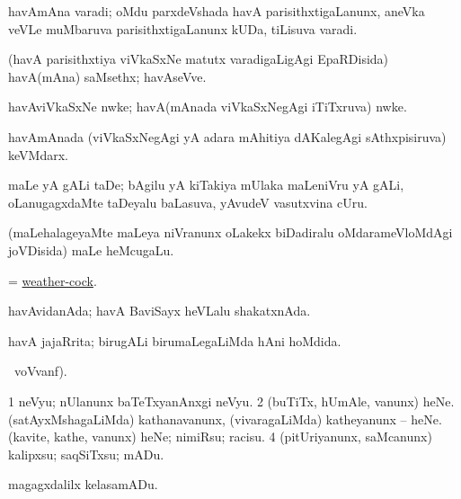 \bentry
{} 
\gl{\nA}
\expl{}
\bmng
havAmAna varadi; oMdu parxdeVshada havA parisithxtigaLanunx, aneVka veVLe muMbaruva parisithxtigaLanunx kUDa, tiLisuva varadi. 
\emng
\eentry

\bentry
{} 
\gl{\nA}
\expl{}
\bmng
(havA parisithxtiya viVkaSxNe matutx varadigaLigAgi EpaRDisida) havA(mAna) saMsethx; havAseVve. 
\emng
\eentry

\bentry
{} 
\gl{\nA}
\expl{}
\bmng
havAviVkaSxNe nwke; havA(mAnada viVkaSxNegAgi iTiTxruva) nwke. 
\emng
\eentry

\bentry
{} 
\gl{\nA}
\expl{}
\bmng
havAmAnada (viVkaSxNegAgi yA adara mAhitiya dAKalegAgi sAthxpisiruva) keVMdarx. 
\emng
\eentry

\bentry
{} 
\gl{\nA}
\expl{}
\bmng
maLe yA gALi taDe; bAgilu yA kiTakiya mUlaka maLeniVru yA gALi, oLanugagxdaMte taDeyalu baLasuva, yAvudeV vasutxvina cUru. 
\emng
\eentry

\bentry
{} 
\gl{\nA}
\expl{}
\bmng
(maLehalageyaMte maLeya niVranunx oLakekx biDadiralu oMdarameVloMdAgi joVDisida) maLe heMcugaLu. 
\emng
\eentry

\bentry
{} 
\gl{\nA}
\expl{}
\bmng
= \hyperlink{weathercock}{weather-cock}. 
\emng
\eentry

\bentry
{} 
\gl{\gu}
\expl{}
\bmng
havAvidanAda; havA BaviSayx heVLalu shakatxnAda. 
\emng
\eentry

\bentry
{} 
\gl{\gu}
\expl{}
\bmng
havA jajaRrita; birugALi birumaLegaLiMda hAni hoMdida. 
\emng
\eentry

\bentry
{} 
\gl{\kirx}
 \ucAcx\ voVvanf).

\noindent
\gl{\sakirx}
\bmng
\bnum
\num{1} neVyu; nUlanunx baTeTxyanAnxgi neVyu. 
\num{2} (buTiTx, hUmAle, \mo vanunx) heNe. 
\banum
{} (satAyxMshagaLiMda) kathanavanunx, (vivaragaLiMda) katheyanunx -- heNe. 
 (kavite, kathe, \mo vanunx) heNe; nimiRsu; racisu. 
\eanum
\numie
\num{4} (pitUriyanunx, saMcanunx) kalipxsu; saqSiTxsu; mADu. 
\enum
\emng

\noindent 
\gl{\akirx}
\expl{}
\bmng
magagxdalilx kelasamADu. 
\emng
\eentry

